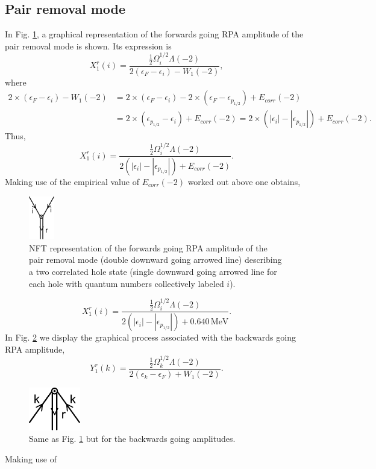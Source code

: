 \subsection{Pair removal mode}
In Fig. \ref{fig1E2}, a graphical representation of the forwards going RPA amplitude of the pair removal mode is shown. Its expression is 
\begin{equation*}
X_1^r(i)=\frac{\frac{1}{2}\Omega_i^{1/2}\Lambda(-2)}{2(\epsilon_F-\epsilon_i)-W_1(-2)},
\end{equation*}
where
\begin{equation*}
\begin{split}
2\times(\epsilon_F-\epsilon_i)-W_1(-2)&=2\times(\epsilon_F-\epsilon_i)-2\times(\epsilon_F-\epsilon_{p_{1/2}})+E_{corr}(-2)\\
&=2\times(\epsilon_{p_{1/2}}-\epsilon_i)+E_{corr}(-2)=2\times(|\epsilon_i|-|\epsilon_{p_{1/2}}|)+E_{corr}(-2).
\end{split}
\end{equation*}
Thus,
\begin{equation*}
X_1^r(i)=\frac{\frac{1}{2}\Omega_i^{1/2}\Lambda(-2)}{2(|\epsilon_i|-|\epsilon_{p_{1/2}}|)+E_{corr}(-2)}.
\end{equation*}
Making use of the empirical value of $E_{corr}(-2)$ worked out above one obtains, 
  \begin{figure}
  \centerline{\includegraphics*[width=0.1\textwidth,angle=0]{nutshell/figs/removal_forward.pdf}}
  \caption{NFT representation of the forwards going RPA amplitude of the pair removal mode (double downward going arrowed line) describing a two correlated hole state (single downward going arrowed line for each hole with quantum numbers collectively labeled $i$).}\label{fig1E2}
  \end{figure}
\begin{equation*}
X_1^r(i)=\frac{\frac{1}{2}\Omega_i^{1/2}\Lambda(-2)}{2(|\epsilon_i|-|\epsilon_{p_{1/2}}|)+0.640\,\text{MeV}}.
\end{equation*}
In Fig. \ref{fig1E3} we display the graphical process associated with the backwards going RPA amplitude,
\begin{equation*}
Y_1^r(k)=\frac{\frac{1}{2}\Omega_k^{1/2}\Lambda(-2)}{2(\epsilon_k-\epsilon_F)+W_1(-2)}.
\end{equation*}
  \begin{figure}
  \centerline{\includegraphics*[width=0.2\textwidth,angle=0]{nutshell/figs/removal_backward.pdf}}
  \caption{Same as Fig. \ref{fig1E2} but for the backwards going amplitudes.}\label{fig1E3}
  \end{figure}
  Making use of

